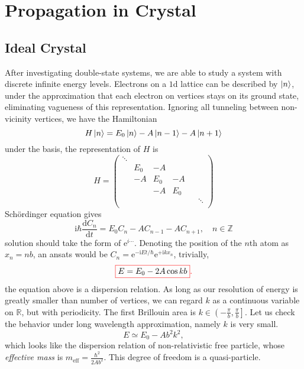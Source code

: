 
\chapter[晶格中的传播]{Propagation in Crystal}
\section[理想晶体]{Ideal Crystal}
After investigating double-state systems, we are able to study a system with discrete infinite energy levels.
Electrons on a $1$d lattice can be described by $\ket{n}$, under the approximation that each electron on vertices stays on its ground state, eliminating vagueness of this representation. Ignoring all tunneling between non-vicinity vertices, we have the Hamiltonian
\begin{equation}
  H \ket{n} = E_0 \ket{n} - A \ket{n-1} - A \ket{n+1}
\end{equation}
under the basis, the representation of $H$ is
\begin{equation}
  H = \begin{pmatrix}
   \ddots &  &  &  & \\
    & E_0 & -A &  & \\
    & -A & E_0 &-A  & \\
    &  & -A & E_0 & \\
    &  &  &  & &\ddots \\
  \end{pmatrix}
\end{equation}
Sch\"ordinger equation gives
\begin{equation}
  \mathrm{i}  \hbar \frac{\mathrm{d}C_n}{\mathrm{d} t} = E_0 C_n - A C_{n-1} - A C_{n+1}, \quad n\in \mathbb{Z}
\end{equation}
solution should take the form of $\mathrm{e}^{i\cdots}$. Denoting the position of the $n$th atom as $x_n = n b$, an ansats would be $C_n = \mathrm{e}^{- \mathrm{i} E t / \hbar }\mathrm{e}^{+ \mathrm{i} k x_n}$,
trivially, 
\begin{equation}
  \color{red}\boxed{\color{black}E = E_0 - 2A \cos kb}.
\end{equation}
the equation above is a dispersion relation. As long as our resolution of energy is greatly smaller than number of vertices, we can regard $k$ as a continuous variable on $\mathbb{R}$, but with periodicity. The first Brillouin area is $k \in \left(- \frac{\pi}{b}, \frac{\pi}{b}\right]$. Let us check the behavior under long wavelength approximation, namely $k$ is very small. 
\begin{equation}
  E \simeq E_0 - A b^{2} k^{2},
\end{equation}
which looks like the dispersion relation of non-relativistic free particle, whose \emph{effective mass} is $m_{\text{eff}} = \frac{\hbar^{2}}{2 A b^{2}}$. This degree of freedom is a quasi-particle.

